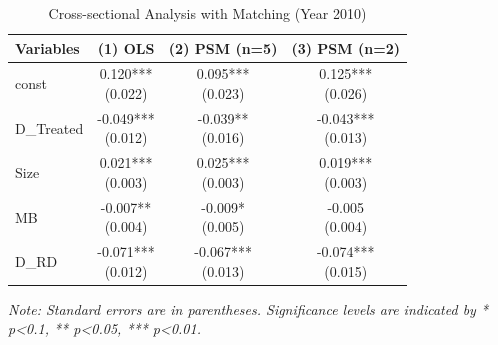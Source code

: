 \documentclass{article}
\begin{document}
\begin{table}[h!]
    \centering
    \caption{Cross-sectional Analysis with Matching (Year 2010)}
    \label{table:6}
    \begin{tabular}{lccc}
        \toprule
        Variables  & (1) OLS             & (2) PSM (n=5) & (3) PSM (n=2) \\
        \midrule
        const      & \makecell{0.120***                                  \\ (0.022)} & \makecell{0.095*** \\ (0.023)} & \makecell{0.125*** \\ (0.026)} \\
        D\_Treated & \makecell{-0.049***                                 \\ (0.012)} & \makecell{-0.039** \\ (0.016)} & \makecell{-0.043*** \\ (0.013)} \\
        Size       & \makecell{0.021***                                  \\ (0.003)}  & \makecell{0.025*** \\ (0.003)} & \makecell{0.019*** \\ (0.003)}  \\
        MB         & \makecell{-0.007**                                  \\ (0.004)}  & \makecell{-0.009*   \\ (0.005)} & \makecell{-0.005    \\ (0.004)} \\
        D\_RD      & \makecell{-0.071***                                 \\ (0.012)} & \makecell{-0.067*** \\ (0.013)} & \makecell{-0.074*** \\ (0.015)} \\
        \bottomrule
    \end{tabular}
    \newline
    \textit{Note: Standard errors are in parentheses. Significance levels are indicated by * p<0.1, ** p<0.05, *** p<0.01.}
\end{table}
\end{document}
